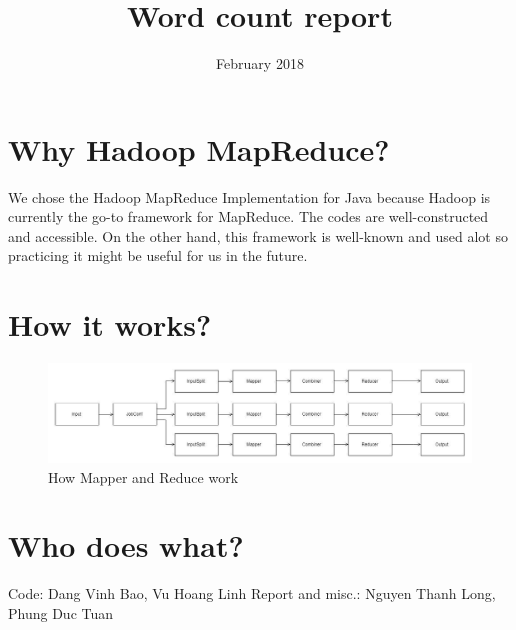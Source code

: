 \documentclass{article}
\title{Word count report}
\date{February 2018}
\begin{document}
\maketitle

\section{Why Hadoop MapReduce?}
We chose the Hadoop MapReduce Implementation for Java because Hadoop is currently the go-to framework for MapReduce. The codes are well-constructed and accessible. On the other hand, this framework is well-known and used alot so practicing it might be useful for us in the future.

\section{How it works?}
\begin{figure}[h!]
\centering
\includegraphics[scale=0.5]{05.wordcount_flowchart}
\caption{How Mapper and Reduce work}
\label{fig:mapreducefigure}
\end{figure}

\section{Who does what?}
Code: Dang Vinh Bao, Vu Hoang Linh
Report and misc.: Nguyen Thanh Long, Phung Duc Tuan
\end{document}
